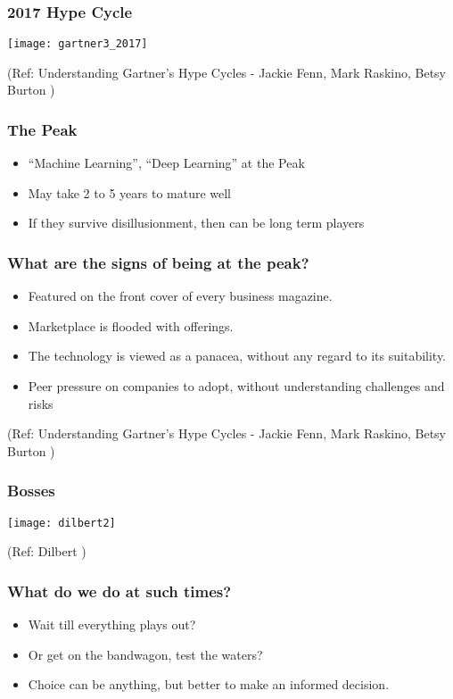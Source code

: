 \begin{frame}[fragile]\frametitle{2017 Hype Cycle}
\begin{center}
\texttt{[image: gartner3\_2017]}
\end{center}
{\tiny (Ref: Understanding Gartner's Hype Cycles - Jackie Fenn, Mark Raskino, Betsy Burton )}
\end{frame}


\begin{frame}[fragile]\frametitle{The Peak}
\begin{itemize}
\item ``Machine Learning'', ``Deep Learning'' at the Peak
\item May take 2 to 5 years to mature well
\item If they survive disillusionment, then can be long term players
\end{itemize}
\end{frame}


\begin{frame}[fragile]\frametitle{What are the signs of being at the peak?}
\begin{itemize}
\item Featured on the front cover of every business magazine.
\item Marketplace is flooded with offerings.
\item  The technology is viewed as a panacea, without any regard to its
suitability.
\item Peer pressure on companies to adopt, without understanding challenges and risks
\end{itemize}
{\tiny (Ref: Understanding Gartner's Hype Cycles - Jackie Fenn, Mark Raskino, Betsy Burton )}
\end{frame}

\begin{frame}[fragile]\frametitle{Bosses}
\begin{center}
\texttt{[image: dilbert2]}
\end{center}
{\tiny (Ref: Dilbert )}
\end{frame}

\begin{frame}[fragile]\frametitle{What do we do at such times?}
\begin{itemize}
\item Wait till everything plays out?
\item Or get on the bandwagon, test the waters?
\item Choice can be anything, but better to make an informed decision.
\end{itemize}
\end{frame}


